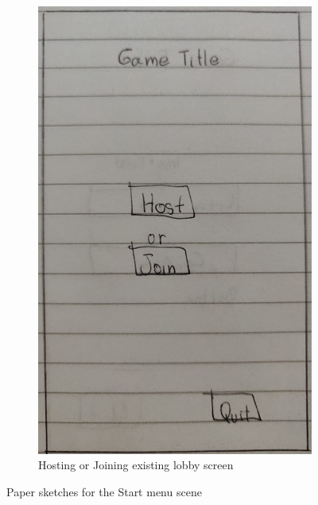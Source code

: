 \documentclass{dissertation}
\begin{document}
\begin{figure}[H]
\begin{subfigure}[h]{.5\textwidth}
\includegraphics[width = .8\linewidth]{images/paper-prototype2.jpeg}
\caption{Hosting or Joining existing lobby screen}
\label{fig:pp2}
\end{subfigure}
\caption{Paper sketches for the Start menu scene}
\label{fig:start-menu}
\end{figure}
\end{document}
